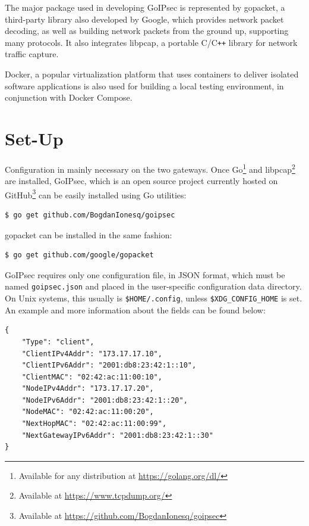 \documentclass[a4paper,12pt]{report}
\begin{document}
		The major package used in developing GoIPsec is represented by gopacket, a third-party library also developed by Google, which provides network packet decoding, as well as building network packets from the ground up, supporting many protocols. It also integrates libpcap, a portable C/C\texttt{++} library for network traffic capture.
		
		Docker, a popular virtualization platform that uses containers to deliver isolated software applications is also used for building a local testing environment, in conjunction with Docker Compose.
		
		\section{Set-Up}
		Configuration in mainly necessary on the two gateways. Once Go\footnote{Available for any distribution at \url{https://golang.org/dl/}} and libpcap\footnote{Available at \url{https://www.tcpdump.org/}} are installed, GoIPsec, which is an open source project currently hosted on GitHub\footnote{Available at \url{https://github.com/BogdanIonesq/goipsec}} can be easily installed using Go utilities:
		\begin{lstlisting}[caption=Installing GoIPsec.]
$ go get github.com/BogdanIonesq/goipsec
		\end{lstlisting}
		gopacket can be installed in the same fashion:
		\begin{lstlisting}[caption=Installing gopacket library.]
$ go get github.com/google/gopacket
		\end{lstlisting}
		GoIPsec requires only one configuration file, in JSON format, which must be named \texttt{goipsec.json} and placed in the user-specific configuration data directory. On Unix systems, this usually is \texttt{\$HOME/.config}, unless \texttt{\$XDG\_CONFIG\_HOME} is set. An example and more information about the fields can be found below:
				\begin{lstlisting}[caption=Example of GoIPsec client-side configuration file.]
{
	"Type": "client",
	"ClientIPv4Addr": "173.17.17.10",
	"ClientIPv6Addr": "2001:db8:23:42:1::10",
	"ClientMAC": "02:42:ac:11:00:10",
	"NodeIPv4Addr": "173.17.17.20",
	"NodeIPv6Addr": "2001:db8:23:42:1::20",
	"NodeMAC": "02:42:ac:11:00:20",
	"NextHopMAC": "02:42:ac:11:00:99",
	"NextGatewayIPv6Addr": "2001:db8:23:42:1::30"
}
		\end{lstlisting}
\end{document}
